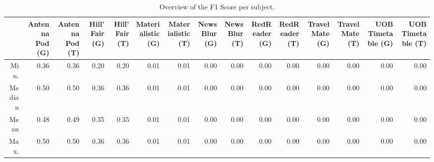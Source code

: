 \begin{table}[ht]
\centering
\begin{tabular}{rrrrrrrrrrrrrrr}
  \hline
 & Antenna Pod (G) & Antenna Pod (T) & Hill'Fair (G) & Hill'Fair (T) & Materialistic (G) & Materialistic (T) & NewsBlur (G) & NewsBlur (T) & RedReader (G) & RedReader (T) & Travel Mate (G) & Travel Mate (T) & UOB Timetable (G) & UOB Timetable (T) \\ 
  \hline
Min. & 0.36 & 0.36 & 0.20 & 0.20 & 0.01 & 0.01 & 0.00 & 0.00 & 0.00 & 0.00 & 0.00 & 0.00 & 0.00 & 0.00 \\ 
  Median & 0.50 & 0.50 & 0.36 & 0.36 & 0.01 & 0.01 & 0.00 & 0.00 & 0.00 & 0.00 & 0.00 & 0.00 & 0.00 & 0.00 \\ 
  Mean & 0.48 & 0.49 & 0.35 & 0.35 & 0.01 & 0.01 & 0.00 & 0.00 & 0.00 & 0.00 & 0.00 & 0.00 & 0.00 & 0.00 \\ 
  Max. & 0.50 & 0.50 & 0.36 & 0.36 & 0.01 & 0.01 & 0.00 & 0.00 & 0.00 & 0.00 & 0.00 & 0.00 & 0.00 & 0.00 \\ 
   \hline
\end{tabular}
\caption{Overview of the F1 Score per subject.} 
\label{tab:results:rq3:summary:subject:f1_score}
\end{table}
